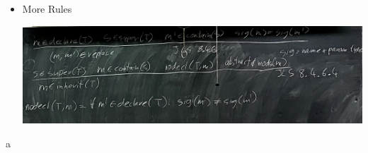 \documentclass{article}
\newtheorem{definition}[theorem]{Definition}
\begin{document}
\begin{itemize}
\begin{itemize}
\begin{definition}
\begin{itemize}
\item contain(T) = declare(T) \(\cup\) inherit(T)
\item replace(\(m, m^\prime\)) 
\begin{itemize}
\item m "overrides" \(m^\prime\)
\item m "hides" \(m^\prime\)
\item f "hides" \(f^\prime\)
\end{itemize}
\end{itemize}
\end{definition}
\newpage
\item More Rules
\begin{center}
\includegraphics[scale=0.1]{11}
\end{center}
\end{itemize}a
\end{itemize}
\end{document}
